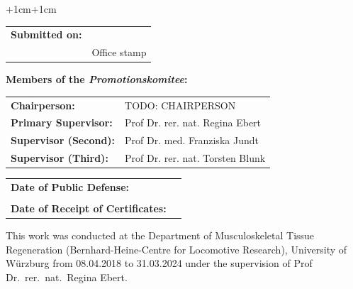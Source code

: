\begin{adjustwidth}{+1cm}{+1cm} %

    \noindent
    \begin{tabular}{l l}
        \textbf{Submitted on:} & \dotuline{\hspace{10cm}} \\
                               & {\small Office stamp}    \\
    \end{tabular}


    \vspace{\vdouble}
    {\noindent\large \textbf{Members of the \textit{Promotionskomitee}:}}

    \vspace{\vhalf}
    \begin{tabular}{l l}
        \textbf{Chairperson:}         & TODO: CHAIRPERSON                \\
        \textbf{Primary Supervisor:}  & Prof Dr. rer. nat. Regina Ebert  \\
        \textbf{Supervisor (Second):} & Prof Dr. med. Franziska Jundt    \\
        \textbf{Supervisor (Third):}  & Prof Dr. rer. nat. Torsten Blunk \\
    \end{tabular}


    \vspace{\vdouble}
    \noindent
    \begin{tabular}{l l}
        \textbf{Date of Public Defense:}          & \dotuline{\hspace{6.45cm}} \\
                                                  &                            \\
        \textbf{Date of Receipt of Certificates:} & \dotuline{\hspace{6.45cm}} \\
    \end{tabular}

\end{adjustwidth}

\thispagestyle{empty} %


\newpage


\vspace*{\fill} %
\noindent
This work was conducted at the Department of Musculoskeletal Tissue
Regeneration (Bernhard-Heine-Centre for Locomotive Research), University
of Würzburg from 08.04.2018 to 31.03.2024 under the supervision of
Prof Dr.~rer.~nat.~Regina Ebert.

\thispagestyle{empty} %